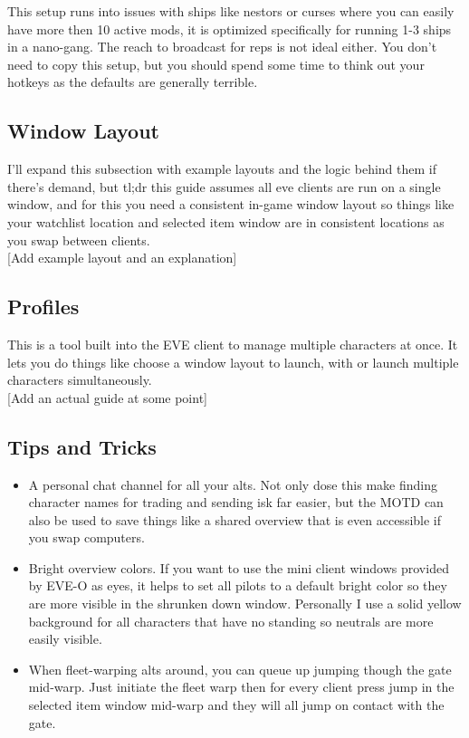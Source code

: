 \documentclass{article}
\begin{document}
This setup runs into issues with ships like nestors or curses where you can easily have more then 10
 active mods, it is optimized specifically for running 1-3 ships in a nano-gang. The reach to broadcast
 for reps is not ideal either. You don't need to copy this setup, but you should spend some time to
 think out your hotkeys as the defaults are generally terrible.

\clearpage
\subsection{Window Layout}
I'll expand this subsection with example layouts and the logic behind them if there's demand, but tl;dr this guide assumes all eve 
clients are run on a single window, and for this you need a consistent in-game window layout so things like your watchlist location 
and selected item window are in consistent locations as you swap between clients. 
\\


[Add example layout and an explanation]

\clearpage
\subsection{Profiles}
This is a tool built into the EVE client to manage multiple characters at once. It lets you do things like choose a window layout to launch,
with or launch multiple characters simultaneously. 
\\

[Add an actual guide at some point]


\clearpage
\subsection{Tips and Tricks}
\begin{itemize}
  \item A personal chat channel for all your alts. Not only dose this make finding character names for trading and sending isk far easier,
        but the MOTD can also be used to save things like a shared overview that is even accessible if you swap computers.
  \item Bright overview colors. If you want to use the mini client windows provided by EVE-O as eyes, it helps to set all pilots to a default
        bright color so they are more visible in the shrunken down window. Personally I use a solid yellow background for all characters that
        have no standing so neutrals are more easily visible.
  \item When fleet-warping alts around, you can queue up jumping though the gate mid-warp. Just initiate the fleet warp then for every client
        press jump in the selected item window mid-warp and they will all jump on contact with the gate.
\end{itemize}
\end{document}
